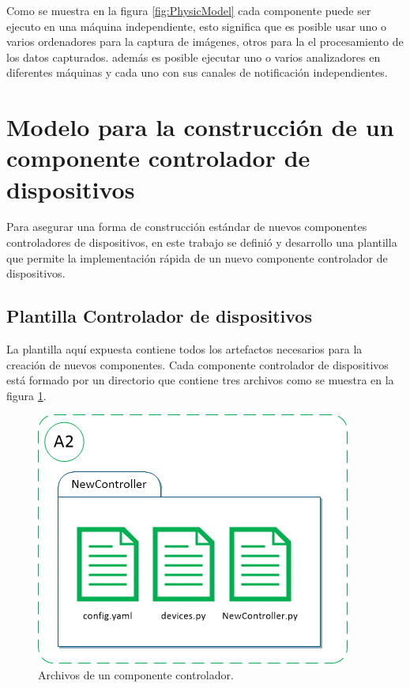     Como se muestra en la figura \ref{fig:PhysicModel} cada componente puede ser ejecuto en una máquina independiente, esto significa que es posible usar uno o varios ordenadores para la captura de imágenes, otros para la el procesamiento de los datos capturados. además es posible ejecutar uno o varios analizadores en diferentes máquinas y cada uno con sus canales de notificación independientes.
    
    \newpage

\section{Modelo para la construcción de un componente controlador de dispositivos}
\label{Sec:DeviceControllerTemplate}
    Para asegurar una forma de construcción estándar de nuevos componentes controladores de dispositivos, en este trabajo se definió y desarrollo una plantilla que permite la implementación rápida de un nuevo componente controlador de dispositivos.

    \subsection{Plantilla Controlador de dispositivos}
    \label{sub:TplController}
        
        La plantilla aquí expuesta contiene todos los artefactos necesarios para la creación de nuevos componentes. Cada componente controlador de dispositivos está formado por un directorio que contiene tres archivos como se muestra en la figura \ref{fig:TplControllerFiles}.
    
        \begin{figure}[ht!]
        	\centering
        	\includegraphics[width=0.5\linewidth]{imgs/03-Architecture/03-TplControllerFiles.png}
        	\caption[Archivos de un componente controlador]{Archivos de un componente controlador.}
    	    \label{fig:TplControllerFiles}
        \end{figure}%
        
